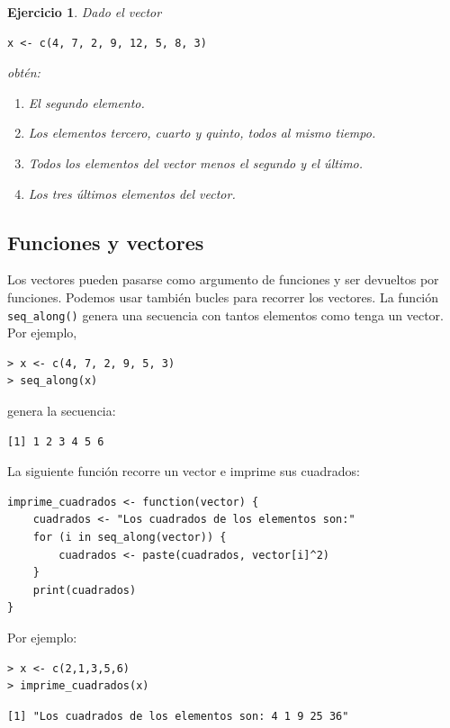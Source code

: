 \documentclass[11pt,a4paper]{article}
\theoremstyle{exercise}
\newtheorem{exercise}{Ejercicio}
\begin{document}
\begin{exercise}
Dado el vector
\begin{lstlisting}[style=rstyle]
x <- c(4, 7, 2, 9, 12, 5, 8, 3)
\end{lstlisting}
obtén:
\begin{enumerate}
\item[a)] El segundo elemento.
\item[b)] Los elementos tercero, cuarto y quinto, todos al mismo tiempo.
\item[c)] Todos los elementos del vector menos el segundo y el último.
\item[d)] Los tres últimos elementos del vector.
\end{enumerate}
\end{exercise}



\subsection{Funciones y vectores}


Los vectores pueden pasarse como argumento de funciones y ser devueltos por funciones. Podemos usar también bucles para recorrer los vectores. La función \texttt{seq\_along()} genera una secuencia con tantos elementos como tenga un vector. Por ejemplo,
\begin{lstlisting}[style=rconsole]
> x <- c(4, 7, 2, 9, 5, 3)
> seq_along(x)
\end{lstlisting}
genera la secuencia:
\begin{lstlisting}[style=routput]
[1] 1 2 3 4 5 6
\end{lstlisting}

\noindent La siguiente función recorre un vector e imprime sus cuadrados:

\begin{lstlisting}[style=rstyle]
imprime_cuadrados <- function(vector) {
	cuadrados <- "Los cuadrados de los elementos son:"
	for (i in seq_along(vector)) {
		cuadrados <- paste(cuadrados, vector[i]^2)
	}
	print(cuadrados)
}
\end{lstlisting}
Por ejemplo:
\begin{lstlisting}[style=rconsole]
> x <- c(2,1,3,5,6)
> imprime_cuadrados(x)
\end{lstlisting}
\begin{lstlisting}[style=routput]
[1] "Los cuadrados de los elementos son: 4 1 9 25 36"
\end{lstlisting}
\end{document}
